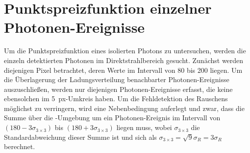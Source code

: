 \section{Punktspreizfunktion einzelner Photonen-Ereignisse}
\label{text:punktspreizfunktion}
Um die Punktspreizfunktion eines isolierten Photons zu untersuchen, werden die einzeln detektierten Photonen im  Direktstrahlbereich gesucht. Zunächst werden diejenigen Pixel betrachtet, deren Werte im Intervall von \SI{80}{\adu} bis \SI{200}{\adu} liegen. Um die Überlagerung der Ladungsverteilung benachbarter Photonen-Ereignisse auszuschließen, werden nur diejenigen Photonen-Ereignisse erfasst, die keine ebensolchen im \SI{5}{px}-Umkreis haben. Um die Fehldetektion des Rauschens möglichst zu verringern, wird eine Nebenbedingung auferlegt und zwar, dass die Summe über die -Umgebung um ein  Photonen-Ereignis im Intervall von $(180-3\sigma_{3\times 3})$ \si{\adu} bis $(180+3\sigma_{3\times 3})$ \si{\adu} liegen muss, wobei $\sigma_{3\times 3}$ die Standardabweichung dieser Summe ist und sich als $\sigma_{3\times 3} = \sqrt{9}\sigma_R = 3 \sigma_R$ berechnet.

